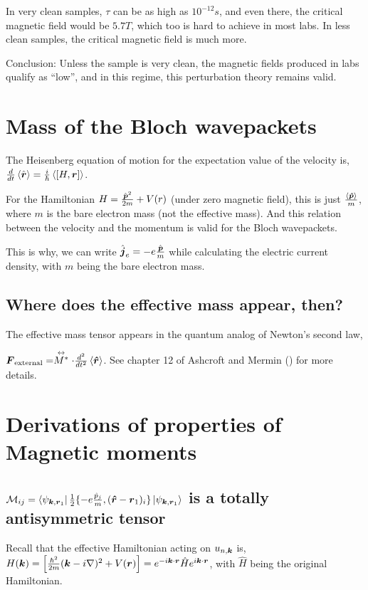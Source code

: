 \documentclass{report}
\renewcommand\vec[1]{\ensuremath\boldsymbol{#1}} %
\begin{document}
In very clean samples, $\tau$ can be as high as $10^{-12} s$, and even there, the critical magnetic field would be  $5.7 T$, which too is hard to achieve in most labs.
In less clean samples, the critical magnetic field is much more.

Conclusion: Unless the sample is very clean, the magnetic fields produced in labs qualify as ``low'', and in this regime, this perturbation theory remains valid.
\chapter{Mass of the Bloch wavepackets}\label{app:mass-of-wavepackets}
The Heisenberg equation of motion for the expectation value of the velocity is,
$\frac{d}{dt}\expval{\hat{\vec{r}}} = \frac{i}{\hbar} \expval{\left[H, \vec{r}\right]}$.

For the Hamiltonian $H = \frac{\hat{\vec{p}}^2}{2m} + V(r)$ (under zero magnetic field), this is just $\frac{\expval{\vec{\hat{p}}}}{m}$, where $m$ is the bare electron mass (not the effective mass). And this relation between the velocity and the momentum is valid for the Bloch wavepackets.

This is why, we can write $\hat{\vec{j}}_e = - e \frac{\hat{\vec{p}}}{m}$ while calculating the electric current density, with $m$ being the bare electron mass.

\section{Where does the effective mass appear, then?}
The effective mass tensor appears in the quantum analog of Newton's second law,

 $\vec{F}_{\text{external}} = \stackrel{\leftrightarrow}{M^*} \cdot \frac{d^2}{d t^2} \expval{\vec{\hat{r}}}$. See chapter 12 of Ashcroft and Mermin (\cite{book:AshcroftMermin76}) for more details.

\chapter{Derivations of properties of Magnetic moments}\label{app:all-about-mag-mom}
\section{$\mathcal{M}_{ij} = \bra{\psi_{\vec{k},\vec{r}_1}} \frac{1}{2}\{-e\frac{\hat{p}_j}{m}, (\vec{\hat{r}} - \vec{r}_1)_i\} \ket{\psi_{\vec{k},\vec{r}_1}} $ is a totally antisymmetric tensor}
Recall that the effective Hamiltonian acting on $u_{n, \vec{k}}$ is, $H(\vec{k})  = \left[\frac{\hbar^2}{2m}(\vec{k} - i \nabla)^2 + V(\vec{r}) \right] = e^{-i \vec{k}\cdot\vec{r}} \hat{H} e^{i \vec{k}\cdot\vec{r}}$, with $\hat{H}$ being the original Hamiltonian.
\end{document}

